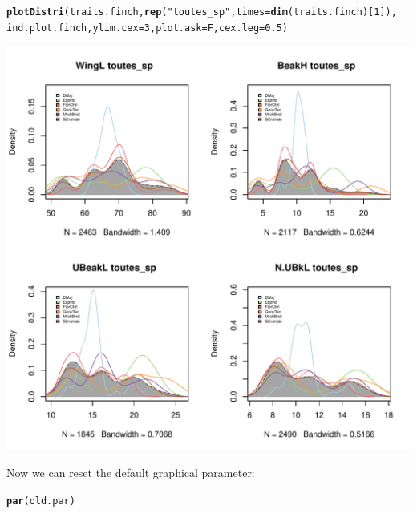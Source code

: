 \documentclass[12pt]{article}\usepackage[]{graphicx}\usepackage[]{color}
\makeatletter
\def\maxwidth{ %
  \ifdim\Gin@nat@width>\linewidth
    \linewidth
  \else
    \Gin@nat@width
  \fi
}
\newcommand{\hlnum}[1]{\textcolor[rgb]{0.686,0.059,0.569}{#1}}%
\newcommand{\hlstr}[1]{\textcolor[rgb]{0.192,0.494,0.8}{#1}}%
\newcommand{\hlstd}[1]{\textcolor[rgb]{0.345,0.345,0.345}{#1}}%
\newcommand{\hlkwc}[1]{\textcolor[rgb]{0.333,0.667,0.333}{#1}}%
\newcommand{\hlkwd}[1]{\textcolor[rgb]{0.737,0.353,0.396}{\textbf{#1}}}%
\newenvironment{kframe}{%
 \def\at@end@of@kframe{}%
 \ifinner\ifhmode%
  \def\at@end@of@kframe{\end{minipage}}%
  \begin{minipage}{\columnwidth}%
 \fi\fi%
 \def\FrameCommand##1{\hskip\@totalleftmargin \hskip-\fboxsep
 \colorbox{shadecolor}{##1}\hskip-\fboxsep
     \hskip-\linewidth \hskip-\@totalleftmargin \hskip\columnwidth}%
 \MakeFramed {\advance\hsize-\width
   \@totalleftmargin\z@ \linewidth\hsize
   \@setminipage}}%
 {\par\unskip\endMakeFramed%
 \at@end@of@kframe}
\newenvironment{knitrout}{}{} %
\makeatother
\begin{document}
\begin{knitrout}
\color{fgcolor}\begin{kframe}
\begin{alltt}
\hlkwd{plotDistri}\hlstd{(traits.finch,} \hlkwd{rep}\hlstd{(}\hlstr{"toutes_sp"}\hlstd{,} \hlkwc{times} \hlstd{=} \hlkwd{dim}\hlstd{(traits.finch)[}\hlnum{1}\hlstd{]),}
     \hlstd{ind.plot.finch,} \hlkwc{ylim.cex} \hlstd{=} \hlnum{3}\hlstd{,} \hlkwc{plot.ask} \hlstd{= F,} \hlkwc{cex.leg} \hlstd{=} \hlnum{0.5}\hlstd{)}
\end{alltt}
\end{kframe}
\includegraphics[width=\maxwidth]{figure/unnamed-chunk-14} 

\end{knitrout}

Now we can reset the default graphical parameter:
\begin{knitrout}
\color{fgcolor}\begin{kframe}
\begin{alltt}
\hlkwd{par}\hlstd{(old.par)}
\end{alltt}
\end{kframe}
\end{knitrout}
\newpage

\end{document}
